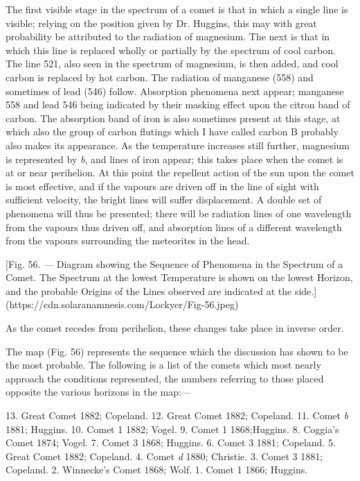\documentclass[a4paper, 12pt, oneside, polutonikogreek, english]{article}
\begin{document}
The first visible stage in the spectrum of a comet is that in which a single line is visible; relying on the position given by Dr. Huggins, this may with great probability be attributed to the radiation of magnesium. The next is that in which this line is replaced wholly or partially by the spectrum of cool carbon. The line 521, also seen in the spectrum of magnesium, is then added, and cool carbon is replaced by hot carbon. The radiation of manganese (558) and sometimes of lead (546) follow. Absorption phenomena next appear; manganese 558 and lead 546 being indicated by their masking effect upon the citron band of carbon. The absorption band of iron is also sometimes present at this stage, at which also the group of carbon flutings which I have called carbon B probably also makes its appearance. As the temperature increases still further, magnesium is represented by \emph{b}, and lines of iron appear; this takes place when the comet is at or near perihelion. At this point the repellent action of the sun upon the comet is most effective, and if the vapours are driven off in the line of sight with sufficient velocity, the bright lines will suffer displacement. A double set of phenomena will thus be presented; there will be radiation lines of one wavelength from the vapours thus driven off, and absorption lines of a different wavelength from the vapours surrounding the meteorites in the head.

[Fig. 56. --- Diagram showing the Sequence of Phenomena in the Spectrum of a Comet. The Spectrum at the lowest Temperature is shown on the lowest Horizon, and the probable Origins of the Lines observed are indicated at the side.](https://cdn.solaranamnesis.com/Lockyer/Fig-56.jpeg)

As the comet recedes from perihelion, these changes take place in inverse order.

The map (Fig. 56) represents the sequence which the discussion has shown to be the most probable. The following is a list of the comets which most nearly approach the conditions represented, the numbers referring to those placed opposite the various horizons in the map:---

13. Great Comet 1882; Copeland. 
12. Great Comet 1882; Copeland. 
11. Comet \emph{b} 1881; Huggins. 
10. Comet 1 1882; Vogel. 
9. Comet 1 1868;Huggins. 
8. Coggia's Comet 1874; Vogel. 
7. Comet 3 1868; Huggins. 
6. Comet 3 1881; Copeland. 
5. Great Comet 1882; Copeland. 
4. Comet \emph{d} 1880; Christie. 
3. Comet 3 1881; Copeland. 
2. Winnecke's Comet 1868; Wolf. 
1. Comet 1 1866; Huggins.
\end{document}
